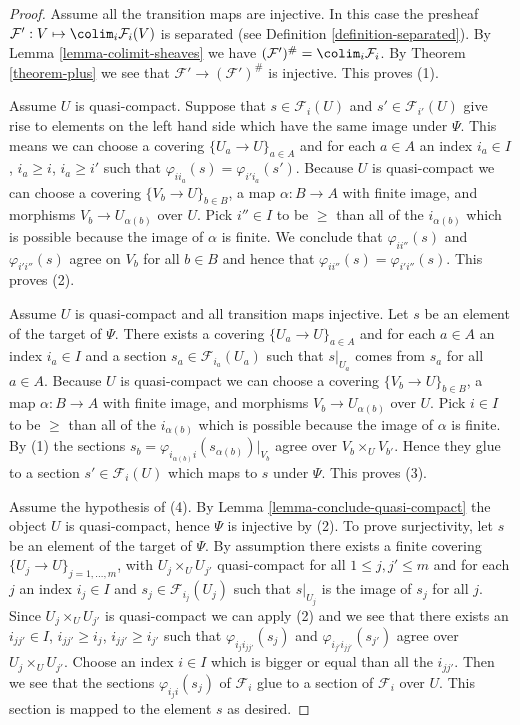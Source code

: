 \begin{proof}
Assume all the transition maps are injective. In this case the presheaf
$\mathcal{F}' : V \mapsto \colim_i \mathcal{F}_i(V)$ is
separated (see Definition \ref{definition-separated}).
By Lemma \ref{lemma-colimit-sheaves}
we have
$(\mathcal{F}')^\# = \colim_i \mathcal{F}_i$.
By Theorem \ref{theorem-plus}
we see that $\mathcal{F}' \to (\mathcal{F}')^\#$ is injective.
This proves (1).

\medskip\noindent
Assume $U$ is quasi-compact. Suppose that $s \in \mathcal{F}_i(U)$ and
$s' \in \mathcal{F}_{i'}(U)$ give rise to elements on
the left hand side which have the same image under $\Psi$.
This means we can choose a covering $\{U_a \to U\}_{a \in A}$
and for each $a \in A$ an index $i_a \in I$, $i_a \geq i$, $i_a \geq i'$
such that $\varphi_{ii_a}(s) = \varphi_{i'i_a}(s')$.
Because $U$ is quasi-compact we can choose a covering
$\{V_b \to U\}_{b \in B}$, a map $\alpha : B \to A$ with finite image,
and morphisms $V_b \to U_{\alpha(b)}$ over $U$.
Pick $i''\in I$ to be $\geq$ than all of the $i_{\alpha(b)}$
which is possible because the image of $\alpha$ is finite.
We conclude that $\varphi_{ii''}(s)$ and $\varphi_{i'i''}(s)$
agree on $V_b$ for all $b \in B$ and hence that
$\varphi_{ii''}(s) = \varphi_{i'i''}(s)$. This proves (2).

\medskip\noindent
Assume $U$ is quasi-compact and all transition maps injective.
Let $s$ be an element of the target of $\Psi$. There exists a covering
$\{U_a \to U\}_{a \in A}$ and for each $a \in A$ an index $i_a \in I$
and a section $s_a \in \mathcal{F}_{i_a}(U_a)$
such that $s|_{U_a}$ comes from $s_a$ for all $a \in A$.
Because $U$ is quasi-compact we can choose a covering
$\{V_b \to U\}_{b \in B}$, a map $\alpha : B \to A$ with finite image,
and morphisms $V_b \to U_{\alpha(b)}$ over $U$.
Pick $i \in I$ to be $\geq$ than all of the $i_{\alpha(b)}$
which is possible because the image of $\alpha$ is finite.
By (1) the sections
$s_b = \varphi_{i_{\alpha(b)} i}(s_{\alpha(b)})|_{V_b}$
agree over $V_b \times_U V_{b'}$.
Hence they glue to a section
$s' \in \mathcal{F}_i(U)$ which maps to $s$ under $\Psi$.
This proves (3).

\medskip\noindent
Assume the hypothesis of (4). By Lemma \ref{lemma-conclude-quasi-compact}
the object $U$ is quasi-compact, hence $\Psi$ is injective by (2).
To prove surjectivity, let $s$ be an element of the target of $\Psi$.
By assumption there  exists a finite covering
$\{U_j \to U\}_{j = 1, \ldots, m}$, with $U_j \times_U U_{j'}$
quasi-compact for all $1 \leq j, j' \leq m$ and
for each $j$ an index $i_j \in I$ and $s_j \in \mathcal{F}_{i_j}(U_j)$
such that $s|_{U_j}$ is the image of $s_j$ for all $j$.
Since $U_j \times_U U_{j'}$ is quasi-compact we can apply (2)
and we see that there exists an $i_{jj'} \in I$,
$i_{jj'} \geq i_j$, $i_{jj'} \geq i_{j'}$ such that
$\varphi_{i_ji_{jj'}}(s_j)$ and $\varphi_{i_{j'}i_{jj'}}(s_{j'})$
agree over $U_j \times_U U_{j'}$. Choose an index $i \in I$
which is bigger or equal than all the $i_{jj'}$. Then we see that
the sections $\varphi_{i_ji}(s_j)$ of $\mathcal{F}_i$ glue
to a section of $\mathcal{F}_i$ over $U$. This section is mapped
to the element $s$ as desired.
\end{proof}

